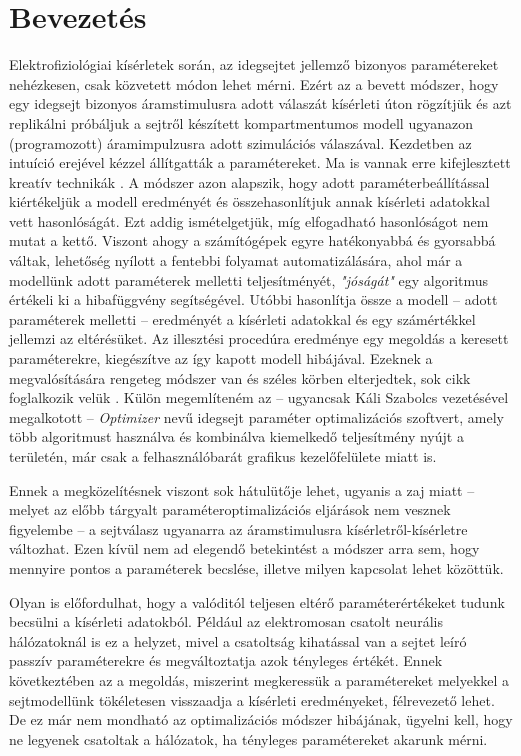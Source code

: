 \section{Bevezetés}

Elektrofiziológiai kísérletek során, az idegsejtet jellemző bizonyos paramétereket nehézkesen, csak közvetett módon lehet mérni. Ezért az a bevett módszer, hogy egy idegsejt bizonyos áramstimulusra adott válaszát kísérleti úton rögzítjük és azt replikálni próbáljuk a sejtről készített kompartmentumos modell ugyanazon (programozott) áramimpulzusra adott szimulációs válaszával. Kezdetben az intuíció erejével kézzel állítgatták a paramétereket. Ma is vannak erre kifejlesztett kreatív technikák \cite{eichner2011hands}. A módszer azon alapszik, hogy adott paraméterbeállítással kiértékeljük a modell eredményét és összehasonlítjuk annak kísérleti adatokkal vett hasonlóságát. Ezt addig ismételgetjük, míg elfogadható hasonlóságot nem mutat a kettő. Viszont ahogy a számítógépek egyre hatékonyabbá és gyorsabbá váltak, lehetőség nyílott a fentebbi folyamat automatizálására, ahol már a modellünk adott paraméterek melletti teljesítményét, \textit{"jóságát"} egy algoritmus értékeli ki a hibafüggvény segítségével. Utóbbi hasonlítja össze a modell -- adott paraméterek melletti -- eredményét a kísérleti adatokkal és egy számértékkel jellemzi az eltérésüket. Az illesztési procedúra eredménye egy megoldás a keresett paraméterekre, kiegészítve az így kapott modell hibájával. Ezeknek a megvalósítására rengeteg módszer van és széles körben elterjedtek, sok cikk foglalkozik velük \cite{druckmann2007novel}\cite{van2007neurofitter}\cite{van2008automated}. Külön megemlíteném az -- ugyancsak Káli Szabolcs vezetésével megalkotott --  \textit{Optimizer}\cite{friedrich2014flexible} nevű idegsejt paraméter optimalizációs szoftvert, amely több algoritmust használva és kombinálva kiemelkedő teljesítmény nyújt a területén, már csak a felhasználóbarát grafikus kezelőfelülete miatt is.

Ennek a megközelítésnek viszont sok hátulütője lehet, ugyanis a zaj miatt -- melyet az előbb tárgyalt paraméteroptimalizációs eljárások nem vesznek figyelembe -- a sejtválasz ugyanarra az áramstimulusra kísérletről-kísérletre változhat. Ezen kívül nem ad elegendő betekintést a módszer arra sem, hogy mennyire pontos a paraméterek becslése, illetve milyen kapcsolat lehet közöttük.

Olyan is előfordulhat, hogy a valóditól teljesen eltérő paraméterértékeket tudunk becsülni a kísérleti adatokból. Például az elektromosan csatolt neurális hálózatoknál is ez a helyzet\cite{amsalem2016neuron}\cite{szoboszlay2016functional}, mivel a csatoltság kihatással van a sejtet leíró passzív paraméterekre és megváltoztatja azok tényleges értékét. Ennek következtében az a megoldás, miszerint megkeressük a paramétereket melyekkel a sejtmodellünk tökéletesen visszaadja a kísérleti eredményeket, félrevezető lehet. De ez már nem mondható az optimalizációs módszer hibájának, ügyelni kell, hogy ne legyenek csatoltak a hálózatok, ha tényleges paramétereket akarunk mérni.

